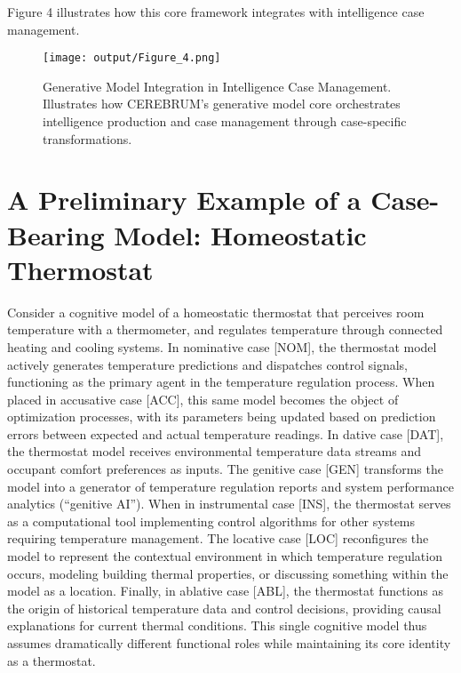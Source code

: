 Figure 4 illustrates how this core framework integrates with
intelligence case management.

\begin{figure}
\centering
\texttt{[image: output/Figure\_4.png]}
\caption{Generative Model Integration in Intelligence Case Management.
Illustrates how CEREBRUM's generative model core orchestrates
intelligence production and case management through case-specific
transformations.}
\end{figure}

\hypertarget{a-preliminary-example-of-a-case-bearing-model-homeostatic-thermostat}{%
\section{A Preliminary Example of a Case-Bearing Model: Homeostatic
Thermostat}\label{a-preliminary-example-of-a-case-bearing-model-homeostatic-thermostat}}

Consider a cognitive model of a homeostatic thermostat that perceives
room temperature with a thermometer, and regulates temperature through
connected heating and cooling systems. In nominative case {[}NOM{]}, the
thermostat model actively generates temperature predictions and
dispatches control signals, functioning as the primary agent in the
temperature regulation process. When placed in accusative case
{[}ACC{]}, this same model becomes the object of optimization processes,
with its parameters being updated based on prediction errors between
expected and actual temperature readings. In dative case {[}DAT{]}, the
thermostat model receives environmental temperature data streams and
occupant comfort preferences as inputs. The genitive case {[}GEN{]}
transforms the model into a generator of temperature regulation reports
and system performance analytics (``genitive AI''). When in instrumental
case {[}INS{]}, the thermostat serves as a computational tool
implementing control algorithms for other systems requiring temperature
management. The locative case {[}LOC{]} reconfigures the model to
represent the contextual environment in which temperature regulation
occurs, modeling building thermal properties, or discussing something
within the model as a location. Finally, in ablative case {[}ABL{]}, the
thermostat functions as the origin of historical temperature data and
control decisions, providing causal explanations for current thermal
conditions. This single cognitive model thus assumes dramatically
different functional roles while maintaining its core identity as a
thermostat.

